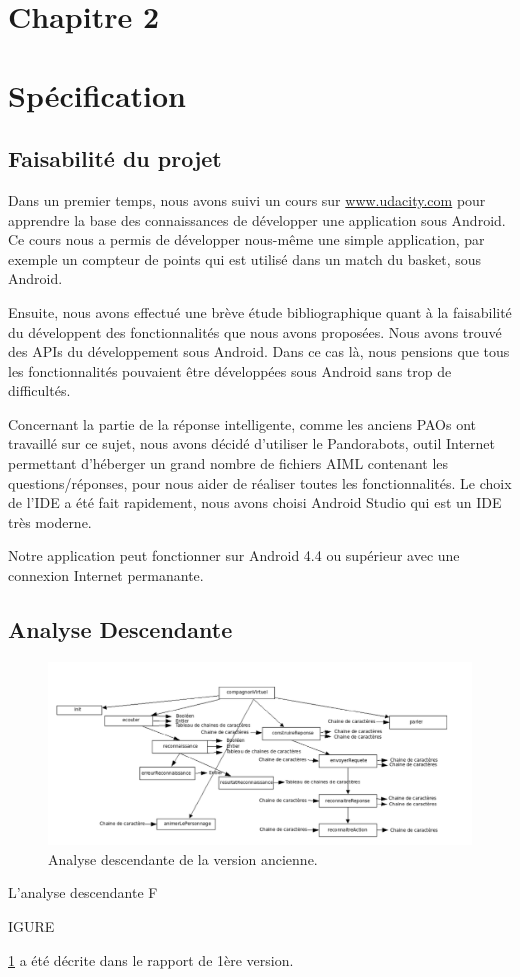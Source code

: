 \section*{Chapitre 2}
\section{Spécification}
\subsection{Faisabilité du projet}
Dans un premier temps, nous avons suivi un cours sur \url{www.udacity.com} pour apprendre la base des connaissances de développer une application sous Android. Ce cours nous a permis de développer nous-même une simple application, par exemple un compteur de points qui est utilisé dans un match du basket, sous Android. 

\indent Ensuite, nous avons effectué une brève étude bibliographique quant à la faisabilité du développent des fonctionnalités que nous avons proposées. Nous avons trouvé des APIs du développement sous Android. Dans ce cas là, nous pensions que tous les fonctionnalités pouvaient être développées sous Android sans trop de difficultés.

\indent Concernant la partie de la réponse intelligente, comme les anciens PAOs ont travaillé sur ce sujet, nous avons décidé d'utiliser le Pandorabots, outil Internet permettant d'héberger un grand nombre de fichiers AIML contenant les questions/réponses, pour nous aider de réaliser toutes les fonctionnalités. Le choix de l'IDE a été fait rapidement, nous avons choisi Android Studio qui est un IDE très moderne.

\indent Notre application peut fonctionner sur Android 4.4 ou supérieur avec une connexion Internet permanante.

\subsection{Analyse Descendante}
\begin{figure}[h]
\centering
\includegraphics[width=1\linewidth]{analyseDescendante.png}
\caption{Analyse descendante de la version ancienne.\label{fig1}}
\end{figure}
\indent L'analyse descendante F\begin{footnotesize}IGURE\end{footnotesize} \ref{fig1} a été décrite dans le rapport de 1ère version.
\newpage

